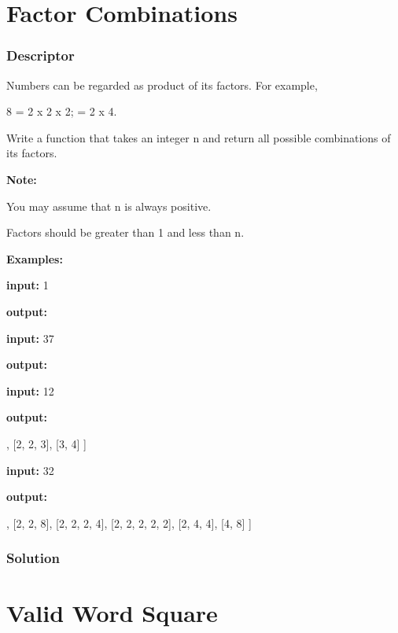 \newpage

\section{Factor Combinations} %
\subsubsection{Descriptor}
Numbers can be regarded as product of its factors. For example,
\begin{Code}
8 = 2 x 2 x 2;
  = 2 x 4.
\end{Code}
Write a function that takes an integer n and return all possible combinations of its factors.

\textbf{Note:}

You may assume that n is always positive.

Factors should be greater than 1 and less than n.

\textbf{Examples:}

\textbf{input:} 1

\textbf{output:} \code{[]}

\textbf{input:} 37

\textbf{output:} \code{[]}

\textbf{input:} 12

\textbf{output:}

\begin{Code}
[
  [2, 6],
  [2, 2, 3],
  [3, 4]
]
\end{Code}

\textbf{input:} 32

\textbf{output:}

\begin{Code}
[
  [2, 16],
  [2, 2, 8],
  [2, 2, 2, 4],
  [2, 2, 2, 2, 2],
  [2, 4, 4],
  [4, 8]
]
\end{Code}

\newpage

\subsubsection{Solution}
\begin{Code}

\end{Code}

\newpage

\section{Valid Word Square} %

